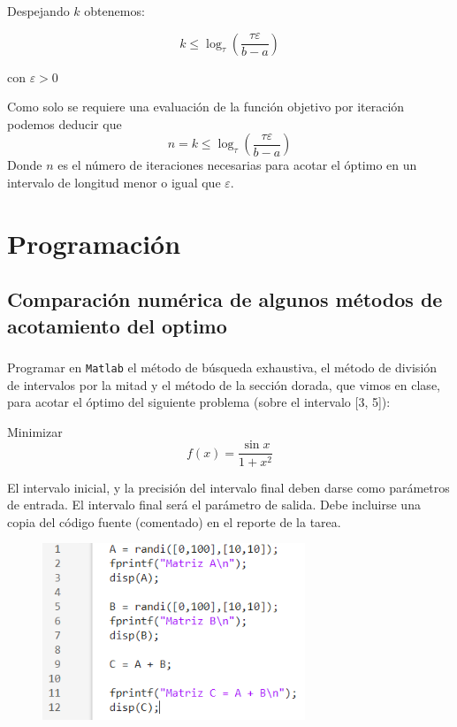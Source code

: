 \documentclass[12pt,oneside]{book}
\begin{document}
Despejando $k$ obtenemos: 

\[k \leq \log_\tau \left(\frac{\tau \varepsilon}{b-a}\right)\] 

con $\varepsilon > 0$

Como solo se requiere una evaluación de la función objetivo por iteración podemos deducir que \[n = k \leq \log_\tau \left(\frac{\tau \varepsilon}{b-a}\right)\] Donde $n$ es el número de iteraciones necesarias para acotar el óptimo en un intervalo de longitud
menor o igual que $\varepsilon$.

\chapter{Programación}

\section{Comparación numérica de algunos métodos de acotamiento del optimo}

\subsection[Ejercicio 1]{}
Programar en \verb|Matlab| el método de búsqueda exhaustiva, el método de división de intervalos por la mitad y el método de la
sección dorada, que vimos en clase, para acotar el óptimo del siguiente
problema (sobre el intervalo [3, 5]):

Minimizar \[f(x) = \frac{\sin x}{1+x^2}\]

El intervalo inicial, y la precisión del intervalo final deben darse como
parámetros de entrada. El intervalo final será el parámetro de salida. Debe
incluirse una copia del código fuente (comentado) en el reporte de la tarea.

\begin{figure}[H]
    \centering
    \includegraphics[width = 0.7\textwidth]{figura1}
\end{figure}
\end{document}

